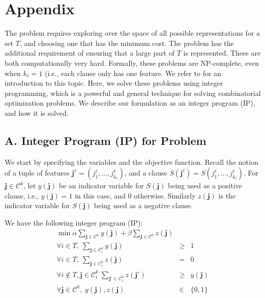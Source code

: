 \appendix
\section*{Appendix}
The \mindesc{} problem requires exploring over the space of
all possible representations for a set $T$, and choosing one that has the minimum
cost. The \minapproxdesc{} problem has the additional requirement of ensuring that
a large part of $T$ is represented. These are both computationally very hard.
Formally, these problems are NP-complete, even when $k_{\ell}= 1$ (i.e., each clause
only has one feature.  We refer to \cite{GareyJohnson} for an introduction to this topic.
Here, we solve these problems using integer programming,
which is a powerful and general technique for solving combinatorial optimization problems.
We describe our formulation as an integer program (IP), and how it is solved.

\subsection*{A. Integer Program (IP) for \mindesc{} Problem}

We start by specifying the variables and the objective function.
Recall the notion of a tuple of features 
$\mathbf{j}^{\ell}=(j^{\ell}_1,\ldots,j^{\ell}_{k_{\ell}})$, and a clause
$S(\mathbf{j}^{\ell}) = S(j^{\ell}_1,\ldots,j^{\ell}_{k_{\ell}})$.
For $\mathbf{j}\in\mathcal{C}^k$,
let $y(\mathbf{j})$ be an indicator variable for $S(\mathbf{j})$ 
being used as a positive clause, i.e., $y(\mathbf{j})=1$ in this case, and $0$ otherwise.
Similarly $z(\mathbf{j})$ is the indicator variable
for $S(\mathbf{j})$ being used as a negative clause. 


We have the following integer program (IP):
\begin{eqnarray}
\nonumber
\min \alpha \sum_{\mathbf{j}\in\mathcal{C}^k} y(\mathbf{j}) + 
\beta \sum_{\mathbf{j}\in\mathcal{C}^k} z(\mathbf{j}) && \\
\label{eqn1}
\forall i\in T,\ \sum_{\mathbf{j}\in\mathcal{C}^k_i} y(\mathbf{j}) &\geq& 1\\
\label{eqn2}
\forall i\in T,\ \sum_{\mathbf{j}\in\mathcal{C}^k_i} z(\mathbf{j}) &=& 0\\
\label{eqn3}
\forall i\not\in T, \mathbf{j}\in \mathcal{C}^k_i\ \sum_{\mathbf{j'}\in\mathcal{C}^k_i} z(\mathbf{j'}) &\geq& y(\mathbf{j})\\
\nonumber
\forall \mathbf{j}\in \mathcal{C}^k,\ y(\mathbf{j}), z(\mathbf{j}) &\in& \{0, 1\}
\end{eqnarray}

